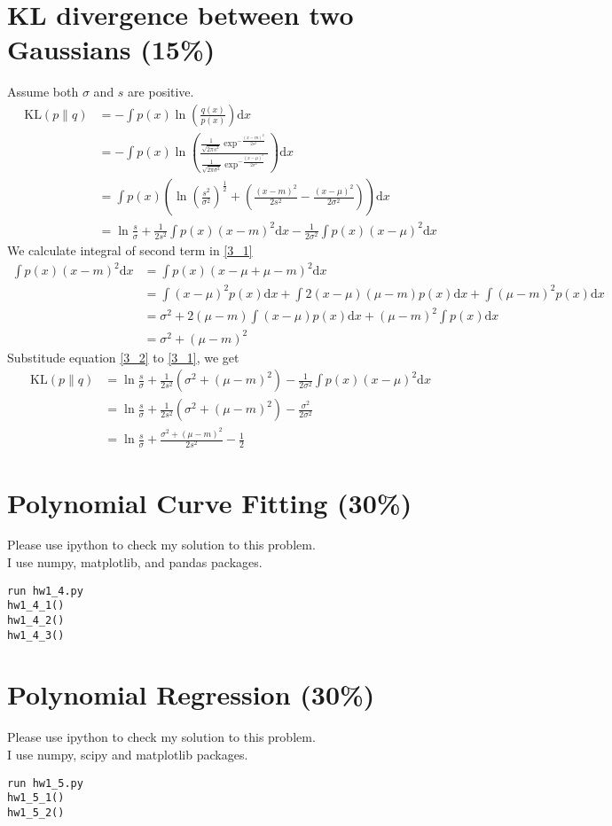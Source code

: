 \documentclass[12pt]{article}
\numberwithin{equation}{section}
\begin{document}
\section{KL divergence between two Gaussians (15\%)}
Assume both $\sigma$ and $s$ are positive.
\begin{align}
  \mathrm{KL}(p\parallel q)
    & = -\int p(x)\ln\left(\frac{q(x)}{p(x)}\right)\mathrm{d}x\nonumber\\
    & = -\int p(x)\ln\left(\frac{\frac{1}{\sqrt{2\pi s^2}}\exp^{-\frac{(x-m)^2}{2s^2}}}{\frac{1}{\sqrt{2\pi\sigma^2}}\exp^{-\frac{(x-\mu)^2}{2\sigma^2}}}\right)\mathrm{d}x\nonumber\\
    & = \int p(x)\left(\ln\left(\frac{s^2}{\sigma^2}\right)^\frac{1}{2}+\left(\frac{(x-m)^2}{2s^2}-\frac{(x-\mu)^2}{2\sigma^2}\right)\right)\mathrm{d}x\nonumber\\
    & = \ln\frac{s}{\sigma}+\frac{1}{2s^2}\int p(x)(x-m)^2\mathrm{d}x-\frac{1}{2\sigma^2}\int p(x)(x-\mu)^2\mathrm{d}x\label{3_1}
\end{align}
We calculate integral of second term in \eqref{3_1}
\begin{align}
  \int p(x)(x-m)^2\mathrm{d}x
    & = \int p(x)(x-\mu+\mu-m)^2\mathrm{d}x\nonumber\\
    & = \int (x-\mu)^2p(x)\mathrm{d}x+\int 2(x-\mu)(\mu-m)p(x)\mathrm{d}x+\int (\mu-m)^2p(x)\mathrm{d}x\nonumber\\
    & = \sigma^2+2(\mu-m)\int (x-\mu)p(x)\mathrm{d}x+(\mu-m)^2\int p(x)\mathrm{d}x\nonumber\\
    & = \sigma^2+(\mu-m)^2\label{3_2}
\end{align}
Substitude equation \eqref{3_2} to \eqref{3_1}, we get
\begin{align*}
  \mathrm{KL}(p\parallel q)
    & = \ln\frac{s}{\sigma}+\frac{1}{2s^2}\left(\sigma^2+(\mu-m)^2\right)-\frac{1}{2\sigma^2}\int p(x)(x-\mu)^2\mathrm{d}x\\
    & = \ln\frac{s}{\sigma}+\frac{1}{2s^2}\left(\sigma^2+(\mu-m)^2\right)-\frac{\sigma^2}{2\sigma^2}\\
    & = \ln\frac{s}{\sigma}+\frac{\sigma^2+(\mu-m)^2}{2s^2}-\frac{1}{2}
\end{align*}
\section{Polynomial Curve Fitting (30\%)}
Please use ipython to check my solution to this problem.\\
I use numpy, matplotlib, and pandas packages.
\begin{lstlisting}
run hw1_4.py
hw1_4_1()
hw1_4_2()
hw1_4_3()
\end{lstlisting}
\section{Polynomial Regression (30\%)}
Please use ipython to check my solution to this problem.\\
I use numpy, scipy and matplotlib packages.
\begin{lstlisting}
run hw1_5.py
hw1_5_1()
hw1_5_2()
\end{lstlisting}
\end{document}
